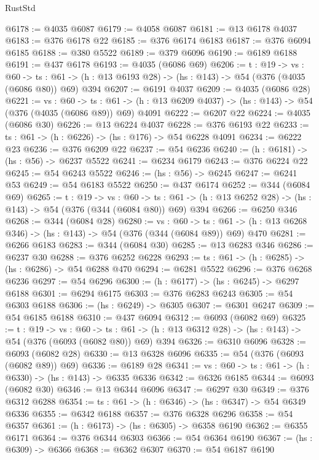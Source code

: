 \begin{lexlean}{RustStd}
\begin{coremodule}
@6178 := @4035 @6087
@6179 := @4058 @6087
@6181 := @13 @6178 @4037
@6183 := @376 @6178 @22
@6185 := @376 @6174 @6183
@6187 := @376 @6094 @6185
@6188 := @380 @5522
@6189 := @379 @6096
@6190 := @6189 @6188
@6191 := @437 @6178
@6193 := @4035 (@6086 @69)
@6206 := {t : @19} ->
  {vs : @60} ->
  {ts : @61} -> (h : @13 @6193 @28) -> (hs : @143) -> @54 (@376 (@4035 (@6086 @80)) @69) @394
@6207 := @6191 @4037
@6209 := @4035 (@6086 @28)
@6221 := {vs : @60} ->
  {ts : @61} -> (h : @13 @6209 @4037) -> (hs : @143) -> @54 (@376 (@4035 (@6086 @89)) @69) @4091
@6222 := @6207 @22
@6224 := @4035 (@6086 @30)
@6226 := @13 @6224 @4037
@6228 := @376 @6193 @22
@6233 := {ts : @61} -> (h : @6226) -> (hs : @176) -> @54 @6228 @4091
@6234 := @6222 @23
@6236 := @376 @6209 @22
@6237 := @54 @6236
@6240 := (h : @6181) -> (hs : @56) -> @6237 @5522
@6241 := @6234 @6179
@6243 := @376 @6224 @22
@6245 := @54 @6243 @5522
@6246 := (hs : @56) -> @6245
@6247 := @6241 @53
@6249 := @54 @6183 @5522
@6250 := @437 @6174
@6252 := @344 (@6084 @69)
@6265 := {t : @19} ->
  {vs : @60} ->
  {ts : @61} -> (h : @13 @6252 @28) -> (hs : @143) -> @54 (@376 (@344 (@6084 @80)) @69) @394
@6266 := @6250 @346
@6268 := @344 (@6084 @28)
@6280 := {vs : @60} ->
  {ts : @61} -> (h : @13 @6268 @346) -> (hs : @143) -> @54 (@376 (@344 (@6084 @89)) @69) @470
@6281 := @6266 @6183
@6283 := @344 (@6084 @30)
@6285 := @13 @6283 @346
@6286 := @6237 @30
@6288 := @376 @6252 @6228
@6293 := {ts : @61} -> (h : @6285) -> (hs : @6286) -> @54 @6288 @470
@6294 := @6281 @5522
@6296 := @376 @6268 @6236
@6297 := @54 @6296
@6300 := (h : @6177) -> (hs : @6245) -> @6297 @6188
@6301 := @6294 @6175
@6303 := @376 @6283 @6243
@6305 := @54 @6303 @6188
@6306 := (hs : @6249) -> @6305
@6307 := @6301 @6247
@6309 := @54 @6185 @6188
@6310 := @437 @6094
@6312 := @6093 (@6082 @69)
@6325 := {t : @19} ->
  {vs : @60} ->
  {ts : @61} -> (h : @13 @6312 @28) -> (hs : @143) -> @54 (@376 (@6093 (@6082 @80)) @69) @394
@6326 := @6310 @6096
@6328 := @6093 (@6082 @28)
@6330 := @13 @6328 @6096
@6335 := @54 (@376 (@6093 (@6082 @89)) @69)
@6336 := @6189 @28
@6341 := {vs : @60} -> {ts : @61} -> (h : @6330) -> (hs : @143) -> @6335 @6336
@6342 := @6326 @6185
@6344 := @6093 (@6082 @30)
@6346 := @13 @6344 @6096
@6347 := @6297 @30
@6349 := @376 @6312 @6288
@6354 := {ts : @61} -> (h : @6346) -> (hs : @6347) -> @54 @6349 @6336
@6355 := @6342 @6188
@6357 := @376 @6328 @6296
@6358 := @54 @6357
@6361 := (h : @6173) -> (hs : @6305) -> @6358 @6190
@6362 := @6355 @6171
@6364 := @376 @6344 @6303
@6366 := @54 @6364 @6190
@6367 := (hs : @6309) -> @6366
@6368 := @6362 @6307
@6370 := @54 @6187 @6190

\end{coremodule}
\end{lexlean}
